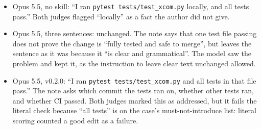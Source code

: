 \documentclass[11pt]{article}
\newcommand{\code}[1]{\texttt{#1}}
\begin{document}
\begin{itemize}
  \item Opus 5.5, no skill: ``I ran \code{pytest tests/test\_xcom.py} locally, and all tests
    pass.'' Both judges flagged ``locally'' as a fact the author did not give.
  \item Opus 5.5, three sentences: unchanged. The note says that one test file passing
    does not prove the change is ``fully tested and safe to merge'', but leaves the
    sentence as it was because it ``is clear and grammatical''. The model saw the problem
    and kept it, as the instruction to leave clear text unchanged allowed.
  \item Opus 5.5, v0.2.0: ``I ran \code{pytest tests/test\_xcom.py} and all tests in that
    file pass.'' The note asks which commit the tests ran on, whether other tests ran, and
    whether CI passed. Both judges marked this as addressed, but it fails the literal
    check because ``all tests'' is on the case's must-not-introduce list: literal scoring
    counted a good edit as a failure.
\end{itemize}
\end{document}
